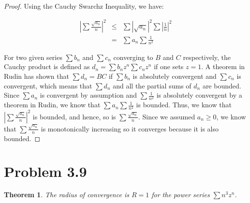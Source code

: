 \documentclass[psamsfonts]{amsart}
\newtheorem{thm}{Theorem}[section]
\theoremstyle{definition}
\theoremstyle{remark}
\numberwithin{equation}{section}
\begin{document}
\begin{proof}

Using the Cauchy Swarchz Inequality, we have:

\begin{eqnarray}
\left| \sum \frac{\sqrt{a_n}}{n} \right|^2 &\leq& \sum |\sqrt{a_n}|^2 \sum \left|\frac{1}{n} \right|^2 \\
&=& \sum a_n \sum \frac{1}{n^2}
\end{eqnarray}

For two given series $\sum b_n$ and $\sum c_n$ converging to $B$ and $C$ respectively, the Cauchy product is defined as $d_n = \sum b_n z^n \sum c_n z^n$ if one sets $z = 1$. A theorem in Rudin has shown that $\sum d_n = BC$ if $\sum b_n$ is absolutely convergent and $\sum c_n$ is convergent, which means that $\sum d_n$ and all the partial sums of $d_n$ are bounded. Since $\sum a_n$ is convergent by assumption and $\sum \frac{1}{n^2}$ is absolutely convergent by a theorem in Rudin, we know that $\sum a_n \sum \frac{1}{n^2}$ is bounded. Thus, we know that $\left| \sum \frac{\sqrt{a_n}}{n} \right|^2 $ is bounded, and hence, so is $\sum \frac{\sqrt{a_n}}{n}$. Since we assumed $a_n \geq 0$, we know that $\sum \frac{\sqrt{a_n}}{n}$ is monotonically increasing so it converges because it is also bounded.
\end{proof}

\section{Problem 3.9}

\begin{thm}
The radius of convergence is $R = 1$ for the power series $\sum n^3 z^n$. 
\end{thm}
\end{document}
